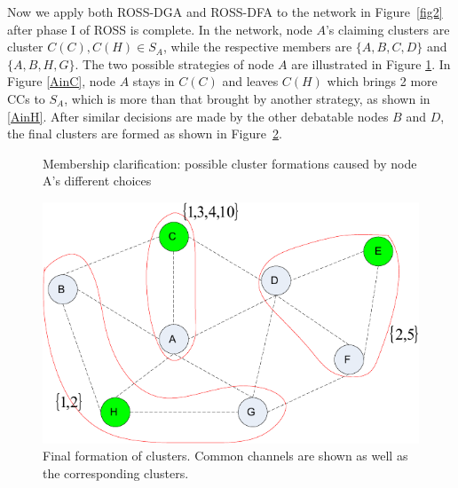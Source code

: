 \documentclass[times]{ettauth}
\theoremstyle{mytheoremstyle}
\theoremstyle{mytheoremstyle}
\theoremstyle{mytheoremstyle}
\begin{document}
Now we apply both ROSS-DGA and ROSS-DFA to the network in Figure~\ref{fig2} after phase I of ROSS is complete.
In the network, node $A$'s claiming clusters are cluster $C(C), C(H)\in S_A$, while the respective members are $\{A,B,C,D\}$ and $\{A,B,H,G\}$. 
The two possible strategies of node $A$ are illustrated in Figure \ref{fig3}.
In Figure \ref{AinC}, node $A$ stays in $C(C)$ and leaves $C(H)$ which brings 2 more CCs to $S_A$, which is more than that brought by another strategy, as shown in \ref{AinH}.
After similar decisions are made by the other debatable nodes $B$ and $D$, the final clusters are formed as shown in Figure~\ref{final_clustering_ross}.



\begin{figure}[h]
\centering
{}
\hspace{.15 in}
\caption[]{Membership clarification: possible cluster formations caused by node A's different choices} %
\label{fig3}
\end{figure}

\begin{figure}[h]
  \centering
  \includegraphics[width=0.5\linewidth]{final_clustering_ross.pdf}
  \caption{Final formation of clusters. Common channels are shown as well as the corresponding clusters.}
  \label{final_clustering_ross}
\end{figure}
\end{document}
